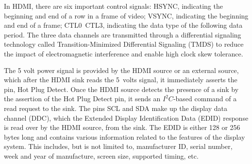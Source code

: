 \documentclass[]{spie}  %
\begin{document}

In HDMI, there are six important control signals: HSYNC, indicating the beginning and end of a row in a frame of video; VSYNC, indicating the beginning and end of a frame; CTL0~CTL3, indicating the data type of the following data period. The three data channels are transmitted through a differential signaling technology called Transition-Minimized Differential Signaling (TMDS) to reduce the impact of electromagnetic interference and enable high clock skew tolerance. %

The 5 volt power signal is provided by the HDMI source or an external source, which after the HDMI sink reads the 5~volts signal, it immediately asserts the pin, Hot Plug Detect. Once the HDMI source detects the presence of a sink by the assertion of the Hot Plug Detect pin, it sends an $I^2C$-based command of a read request to the sink. The pins SCL and SDA make up the display data channel (DDC), which the Extended Display Identification Data (EDID) response is read over by the HDMI source, from the sink. The EDID is either 128 or 256 bytes long and contains various information related to the features of the display system. This includes, but is not limited to, manufacturer ID, serial number, week and year of manufacture, screen size, supported timing, etc.
\end{document}

